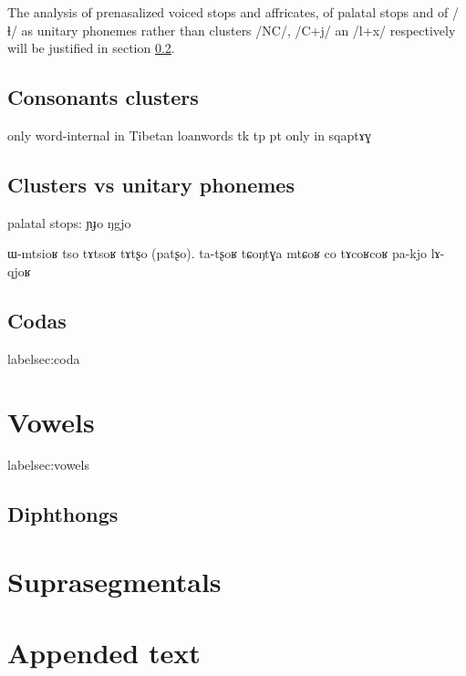 \documentclass[oldfontcommands,oneside,a4paper,11pt]{article}
\newcommand{\ipa}[1]{{\phon #1}} %
\begin{document}
The analysis of prenasalized voiced stops and affricates, of palatal stops and of /ɬ/ as unitary phonemes rather than clusters /NC/, /C+j/ an /l+x/ respectively will be justified in section \ref{sec:non.clusters}. 



  \subsection{Consonants clusters} \label{sec:clusters}
  
  \citet{japhug14ideophones}
 
 
 only word-internal in Tibetan loanwords tk tp 
 pt only in \ipa{sqaptɤɣ}
      \subsection{Clusters vs unitary phonemes} \label{sec:non.clusters}
      
      
palatal stops:      
      \ipa{ɲɟo} \ipa{ŋgjo}
      
      ɯ-mtsioʁ
	tso tɤtsoʁ 
	tɤtʂo (patʂo). ta-tʂoʁ
 tɕoŋtɣa mtɕoʁ
 co tɤcoʁcoʁ
 pa-kjo
     lɤ-qjoʁ
      \subsection{Codas}label{sec:coda}
    
    
     \section{Vowels} label{sec:vowels}
     
          \subsection{Diphthongs}
     
     \section{Suprasegmentals}
     
         
     \section{Appended text}


\end{document}
